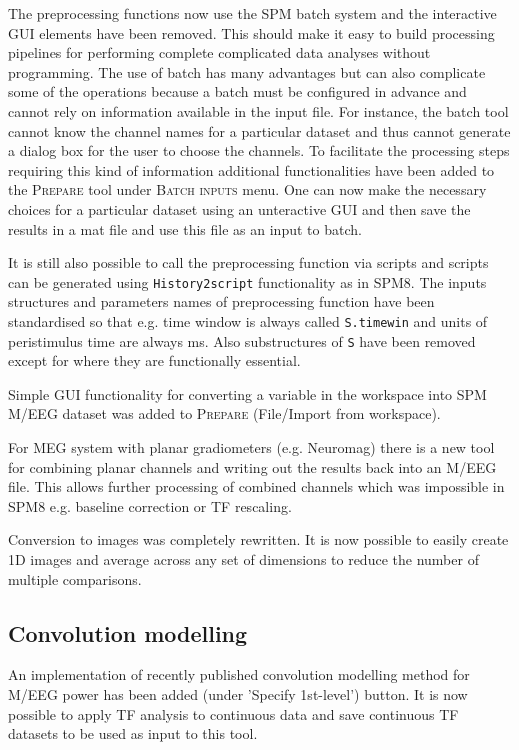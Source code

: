 \documentclass[a4paper,titlepage,openany]{article}
\begin{document}
\begin{multicols}{2}
The preprocessing functions now use the SPM batch system and the interactive GUI elements have been removed. This should make it easy to build processing pipelines for performing complete complicated data analyses without programming. The use of batch has many advantages but can also complicate some of the operations because a batch must be configured in advance and cannot rely on information available in the input file. For instance, the batch tool cannot know the channel names for a particular dataset and thus cannot generate a dialog box for the user to choose the channels. To facilitate the processing steps requiring this kind of information additional functionalities have been added to the \textsc{Prepare} tool under \textsc{Batch inputs} menu. One can now make the necessary choices for a particular dataset using an unteractive GUI and then save the results in a mat file and use this file as an input to batch.

It is still also possible to call the preprocessing function via scripts and scripts can be generated using \texttt{History2script} functionality as in SPM8. The inputs structures and parameters names of preprocessing function have been standardised so that e.g. time window is always called \texttt{S.timewin} and units of peristimulus time are always ms. Also substructures of \texttt{S} have been removed except for where they are functionally essential.

Simple GUI functionality for converting a variable in the workspace into SPM M/EEG dataset was added to \textsc{Prepare} (File/Import from workspace).

For MEG system with planar gradiometers (e.g. Neuromag) there is a new tool for combining planar channels and writing out the results back into an M/EEG file. This allows further processing of combined channels which was impossible in SPM8 e.g. baseline correction or TF rescaling.

Conversion to images was completely rewritten. It is now possible to easily create 1D images and average across any set of dimensions to reduce the number of multiple comparisons.

\subsection{Convolution modelling}

An implementation of recently published convolution modelling method for M/EEG power \cite{Litvak_ConvModel_2013} has been added (under 'Specify 1st-level') button. It is now possible to apply TF analysis to continuous data and save continuous TF datasets to be used as input to this tool.


\end{multicols}
\end{document}
